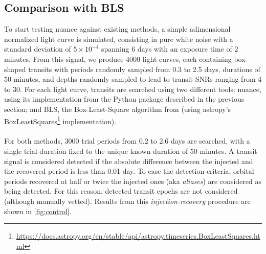 \documentclass[modern]{aastex631}
\newcommand{\nuancecode}{\textsf{nuance}}
\newcommand{\footlink}[1]{\footnote{\url{#1}}}
\begin{document}
\subsection{Comparison with BLS}\label{control}

To start testing \nuancecode{} against existing methods, a simple adimensional normalized light curve is simulated, consisting in pure white noise with a standard deviation of $5\times 10^{-4}$ spanning 6 days with an exposure time of 2 minutes.
From this signal, we produce 4000 light curves, each containing box-shaped transits with periods randomly sampled from 0.3 to 2.5 days, durations of 50 minutes, and depths randomly sampled to lead to transit SNRs ranging from 4 to 30.
For each light curve, transits are searched using two different tools: \textsf{nuance}, using its implementation from the Python package described in the previous section; and BLS, the Box-Least-Square algorithm from \cite{bls} (using \textsf{astropy}'s \textsf{BoxLeastSquares}\footlink{https://docs.astropy.org/en/stable/api/astropy.timeseries.BoxLeastSquares.html} implementation).\\\\
For both methods, 3000 trial periods from 0.2 to 2.6 days are searched, with a single trial duration fixed to the unique known duration of 50 minutes. A transit signal is considered detected if the absolute difference between the injected and the recovered period is less than 0.01 day. To ease the detection criteria, orbital periods recovered at half or twice the injected ones (aka \textit{aliases}) are considered as being detected. For this reason, detected transit epochs are not considered (although manually vetted). Results from this \textit{injection-recovery} procedure are shown in \autoref{fig:control}.
\end{document}
